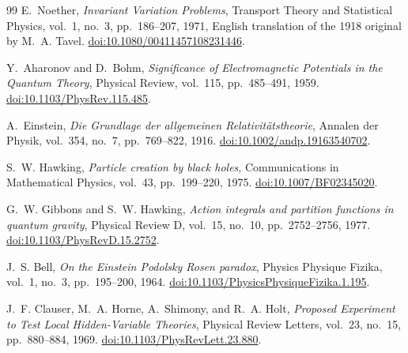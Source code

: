 \documentclass[11pt]{book}
\begin{document}
\begin{thebibliography}{99}
E.~Noether,
\emph{Invariant Variation Problems},
Transport Theory and Statistical Physics, vol.~1, no.~3, pp.~186--207, 1971,
English translation of the 1918 original by M.~A. Tavel.
\href{https://doi.org/10.1080/00411457108231446}{doi:10.1080/00411457108231446}.

Y.~Aharonov and D.~Bohm,
\emph{Significance of Electromagnetic Potentials in the Quantum Theory},
Physical Review, vol.~115, pp.~485--491, 1959.
\href{https://doi.org/10.1103/PhysRev.115.485}{doi:10.1103/PhysRev.115.485}.

A.~Einstein,
\emph{Die Grundlage der allgemeinen Relativit\"atstheorie},
Annalen der Physik, vol.~354, no.~7, pp.~769--822, 1916.
\href{https://doi.org/10.1002/andp.19163540702}{doi:10.1002/andp.19163540702}.

S.~W. Hawking,
\emph{Particle creation by black holes},
Communications in Mathematical Physics, vol.~43, pp.~199--220, 1975.
\href{https://doi.org/10.1007/BF02345020}{doi:10.1007/BF02345020}.

G.~W. Gibbons and S.~W. Hawking,
\emph{Action integrals and partition functions in quantum gravity},
Physical Review D, vol.~15, no.~10, pp.~2752--2756, 1977.
\href{https://doi.org/10.1103/PhysRevD.15.2752}{doi:10.1103/PhysRevD.15.2752}.

J.~S. Bell,
\emph{On the Einstein Podolsky Rosen paradox},
Physics Physique Fizika, vol.~1, no.~3, pp.~195--200, 1964.
\href{https://doi.org/10.1103/PhysicsPhysiqueFizika.1.195}{doi:10.1103/PhysicsPhysiqueFizika.1.195}.

J.~F. Clauser, M.~A. Horne, A.~Shimony, and R.~A. Holt,
\emph{Proposed Experiment to Test Local Hidden-Variable Theories},
Physical Review Letters, vol.~23, no.~15, pp.~880--884, 1969.
\href{https://doi.org/10.1103/PhysRevLett.23.880}{doi:10.1103/PhysRevLett.23.880}.

\end{thebibliography}
\end{document}
